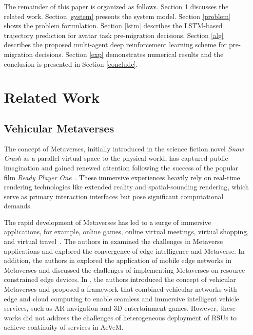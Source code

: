 \documentclass[lettersize,journal]{IEEEtran}
\begin{document}
The remainder of this paper is organized as follows. Section \ref{related} discusses the related work. Section \ref{system} presents the system model. Section \ref{problem} shows the problem formulation. Section \ref{lstm} describes the LSTM-based trajectory prediction for avatar task pre-migration decisions. Section \ref{alg} describes the proposed multi-agent deep reinforcement learning scheme for pre-migration decisions. Section \ref{exp} demonstrates numerical results and the conclusion is presented in Section \ref{conclude}. 


\section{Related Work}\label{related}
\subsection{Vehicular Metaverses}
The concept of Metaverses, initially introduced in the science fiction novel \textit{Snow Crash} as a parallel virtual space to the physical world, has captured public imagination and gained renewed attention following the success of the popular film \textit{Ready Player One}~\cite{jiang2021reliable}. These immersive experiences heavily rely on real-time rendering technologies like extended reality and spatial-sounding rendering, which serve as primary interaction interfaces but pose significant computational demands.

The rapid development of Metaverses has led to a surge of immersive applications, for example, online games, online virtual meetings, virtual shopping, and virtual travel~\cite{kang2022blockchain}. The authors in \cite{lim2022realizing} examined the challenges in Metaverse applications and explored the convergence of edge intelligence and Metaverse. In addition, the authors in \cite{xu2022full} explored the application of mobile edge networks in Metaverses and discussed the challenges of implementing Metaverses on resource-constrained edge devices. In \cite{jiang2021reliable}, the authors introduced the concept of vehicular Metaverses and proposed a framework that combined vehicular networks with edge and cloud computing to enable seamless and immersive intelligent vehicle services, such as AR navigation and 3D entertainment games. However, these works did not address the challenges of heterogeneous deployment of RSUs to achieve continuity of services in AeVeM.
\end{document}
